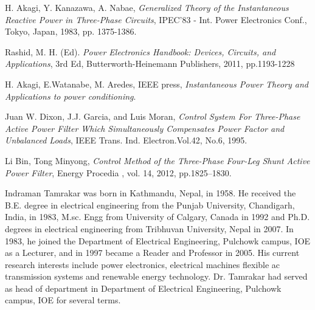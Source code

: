 \documentclass[journal,twoside]{IEEEtran}
\begin{document}
\begin{thebibliography}{9}

 H. Akagi, Y. Kanazawa, A. Nabae, \emph{Generalized Theory of the
Instantaneous Reactive Power in Three-Phase Circuits},
IPEC'83 - Int. Power Electronics Conf., Tokyo, Japan, 1983,
pp. 1375-1386.

 Rashid, M. H. (Ed). \emph{Power Electronics Handbook: Devices,
Circuits, and Applications}, 3rd Ed, Butterworth-Heinemann
Publishers, 2011, pp.1193-1228

 H. Akagi, E.Watanabe, M. Aredes, IEEE press, \emph{Instantaneous
Power Theory and Applications to power conditioning}.

 Juan
W. Dixon, J.J. Garcia, and Luis Moran, \emph{Control
System For Three-Phase Active Power Filter Which
Simultaneously Compensates Power Factor
and
Unbalanced
Loads}, IEEE Trans. Ind. Electron.Vol.42,
No.6, 1995.

 Li Bin, Tong Minyong, \emph{Control Method of the Three-Phase
Four-Leg Shunt Active Power Filter}, Energy Procedia , vol.
14, 2012, pp.1825–1830.

\end{thebibliography}
\begin{IEEEbiography}{Indraman Tamrakar}
was born in
Kathmandu, Nepal, in 1958. He received the B.E. degree in
electrical engineering from the Punjab University, Chandigarh, India, in 1983, M.sc. Engg from University of
Calgary, Canada in 1992 and Ph.D. degrees in electrical
engineering from Tribhuvan University, Nepal in 2007. In
1983, he joined the Department of Electrical
Engineering, Pulchowk campus, IOE as a
Lecturer, and in 1997 became a Reader and
Professor in 2005. His current research interests
include power electronics, electrical machines
flexible ac transmission systems and renewable
energy technology. Dr. Tamrakar had served as
head of department in Department of Electrical
Engineering, Pulchowk campus, IOE for several
terms.
\end{IEEEbiography}
\vspace{-2cm}
\end{document}
